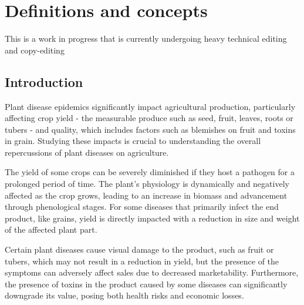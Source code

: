 \documentclass[
  letterpaper,
  DIV=11,
  numbers=noendperiod]{scrreprt}
\begin{document}
\hypertarget{definitions-and-concepts}{%
\chapter{Definitions and concepts}\label{definitions-and-concepts}}

\begin{tcolorbox}[enhanced jigsaw, breakable, left=2mm, opacityback=0, rightrule=.15mm, toprule=.15mm, colframe=quarto-callout-note-color-frame, arc=.35mm, colback=white, bottomrule=.15mm, leftrule=.75mm]
\begin{minipage}[t]{5.5mm}
\textcolor{quarto-callout-note-color}{\faInfo}
\end{minipage}%
\begin{minipage}[t]{\textwidth - 5.5mm}

This is a work in progress that is currently undergoing heavy technical
editing and copy-editing

\end{minipage}%
\end{tcolorbox}

\hypertarget{introduction-1}{%
\section{Introduction}\label{introduction-1}}

Plant disease epidemics significantly impact agricultural production,
particularly affecting crop yield - the measurable produce such as seed,
fruit, leaves, roots or tubers - and quality, which includes factors
such as blemishes on fruit and toxins in grain. Studying these impacts
is crucial to understanding the overall repercussions of plant diseases
on agriculture.

The yield of some crops can be severely diminished if they host a
pathogen for a prolonged period of time. The plant's physiology is
dynamically and negatively affected as the crop grows, leading to an
increase in biomass and advancement through phenological stages. For
some diseases that primarily infect the end product, like grains, yield
is directly impacted with a reduction in size and weight of the affected
plant part.

Certain plant diseases cause visual damage to the product, such as fruit
or tubers, which may not result in a reduction in yield, but the
presence of the symptoms can adversely affect sales due to decreased
marketability. Furthermore, the presence of toxins in the product caused
by some diseases can significantly downgrade its value, posing both
health risks and economic losses.
\end{document}
